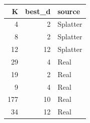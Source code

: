 \begin{tabular}{rrl}
\toprule
K & best\_d & source \\
\midrule
4 & 2 & Splatter \\
8 & 2 & Splatter \\
12 & 12 & Splatter \\
29 & 4 & Real \\
19 & 2 & Real \\
9 & 4 & Real \\
177 & 10 & Real \\
34 & 12 & Real \\
\bottomrule
\end{tabular}
